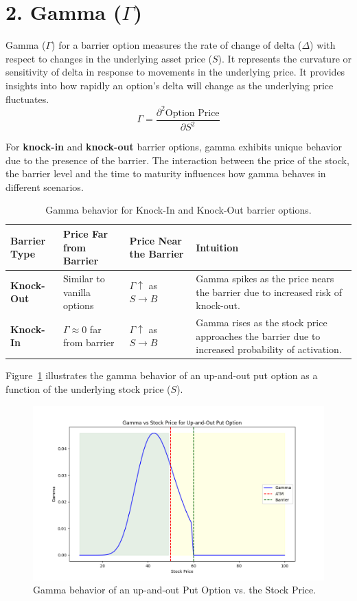 \section*{2. Gamma (\(\Gamma\))}

Gamma (\(\Gamma\)) for a barrier option measures the rate of change of delta (\(\Delta\)) with respect to changes in the underlying asset price (\(S\)). It represents the curvature or sensitivity of delta in response to movements in the underlying price. It provides insights into how rapidly an option's delta will change as the underlying price fluctuates.
\[
\Gamma = \frac{\partial^2 \text{Option Price}}{\partial S^2}
\]

For \textbf{knock-in} and \textbf{knock-out} barrier options, gamma exhibits unique behavior due to the presence of the barrier. The interaction between the price of the stock, the barrier level and the time to maturity influences how gamma behaves in different scenarios.
\begin{table}[htbp]
\centering
\begin{tabularx}{\textwidth}{|X|X|X|X|}
\hline
\textbf{Barrier Type}         & \textbf{Price Far from Barrier} & \textbf{Price Near the Barrier} & \textbf{Intuition}                              \\ 
\hline
\textbf{Knock-Out} & Similar to vanilla options     & $\Gamma \uparrow$ as $S \to B$  & Gamma spikes as the price nears the barrier due to increased risk of knock-out. \\ 
\hline
\textbf{Knock-In}    & $\Gamma \approx 0$ far from barrier   & $\Gamma \uparrow$ as $S \to B$  & Gamma rises as the stock price approaches the barrier due to increased probability of activation. \\ 
\hline
\end{tabularx}
\caption{Gamma behavior for Knock-In and Knock-Out barrier options.}
\label{tab:gamma_barrier_options}
\end{table}


Figure~\ref{fig:gamma_behavior} illustrates the gamma behavior of an up-and-out put option as a function of the underlying stock price (\(S\)). 

\begin{figure}[h]
    \centering
    \includegraphics[width=.65\linewidth]{content/images/gamma.png}
    \caption{Gamma behavior of an up-and-out Put Option vs. the Stock Price.}
    \label{fig:gamma_behavior}
\end{figure}

